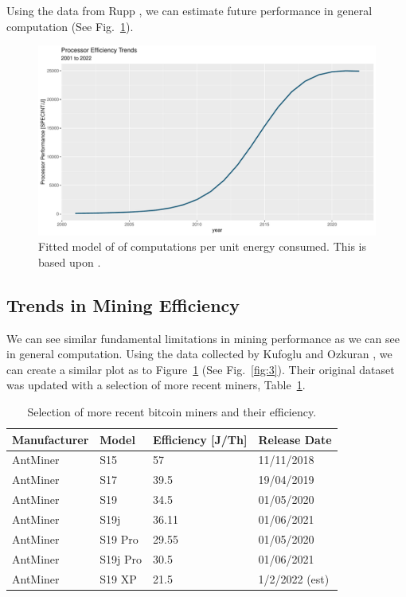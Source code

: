 \documentclass[runningheads]{llncs}
\begin{document}
Using the data from Rupp \cite{rupp2020trends}, we can estimate future performance in general computation (See Fig.~\ref{fig:2}).

\begin{figure}
    \includegraphics[width=\textwidth]{Processor Forecast.pdf}
    \caption{Fitted model of of computations per unit energy consumed. This is based upon \cite{rupp2020trends}.} \label{fig:2}
\end{figure}

\subsection{Trends in Mining Efficiency}

We can see similar fundamental limitations in mining performance as we can see in general computation.
Using the data collected by Kufoglu and Ozkuran \cite{kuf2019mining}, we can create a similar plot as to Figure~\ref{fig:2} (See Fig.~\ref{fig:3}).
Their original dataset was updated with a selection of more recent miners, Table~\ref{tbl:1}.

\begin{table}
    \caption{Selection of more recent bitcoin miners and their efficiency.}\label{tbl:1}
    \begin{tabular}{|l|l|l|l|}
        \hline
        Manufacturer & Model    & Efficiency [J/Th] & Release Date   \\
        \hline
        AntMiner     & S15      & 57                & 11/11/2018     \\
        AntMiner     & S17      & 39.5              & 19/04/2019     \\
        AntMiner     & S19      & 34.5              & 01/05/2020     \\
        AntMiner     & S19j     & 36.11             & 01/06/2021     \\
        AntMiner     & S19 Pro  & 29.55             & 01/05/2020     \\
        AntMiner     & S19j Pro & 30.5              & 01/06/2021     \\
        AntMiner     & S19 XP   & 21.5              & 1/2/2022 (est) \\
        \hline
    \end{tabular}
\end{table}
\end{document}
